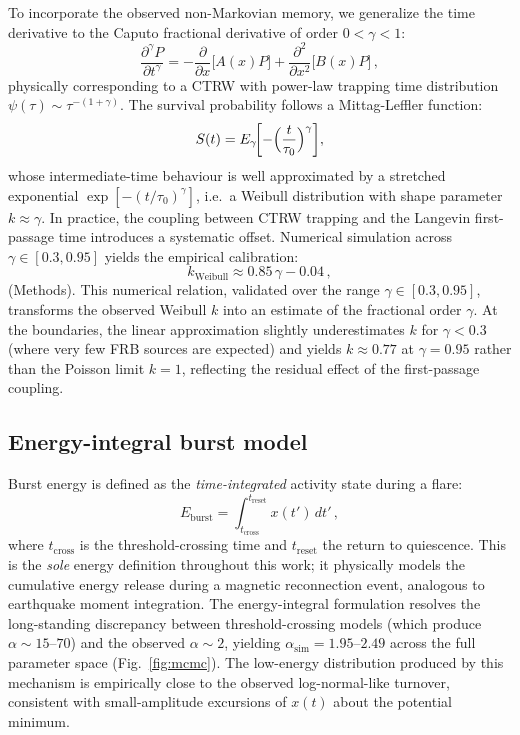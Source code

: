 \documentclass[twocolumn]{article}
\begin{document}
To incorporate the observed non-Markovian memory, we generalize the time derivative to the Caputo fractional derivative of order $0 < \gamma < 1$:
\begin{equation}
\frac{\partial^\gamma P}{\partial t^\gamma} = -\frac{\partial}{\partial x}\bigl[A(x)P\bigr] + \frac{\partial^2}{\partial x^2}\bigl[B(x)P\bigr]\,,
\label{eq:FFPE}
\end{equation}
physically corresponding to a CTRW with power-law trapping time distribution $\psi(\tau) \sim \tau^{-(1+\gamma)}$\cite{metzler2000}. The survival probability follows a Mittag-Leffler function:
\begin{equation}
S(t) = E_\gamma\!\biggl[-\Bigl(\frac{t}{\tau_0}\Bigr)^\gamma\biggr],
\label{eq:mittag}
\end{equation}
whose intermediate-time behaviour is well approximated by a stretched exponential $\exp[-(t/\tau_0)^\gamma]$, i.e.\ a Weibull distribution with shape parameter $k \approx \gamma$. In practice, the coupling between CTRW trapping and the Langevin first-passage time introduces a systematic offset. Numerical simulation across $\gamma \in [0.3, 0.95]$ yields the empirical calibration:
\begin{equation}
k_{\mathrm{Weibull}} \approx 0.85\,\gamma - 0.04\,,
\label{eq:k_gamma}
\end{equation}
(Methods). This numerical relation, validated over the range $\gamma \in [0.3, 0.95]$, transforms the observed Weibull $k$ into an estimate of the fractional order $\gamma$. At the boundaries, the linear approximation slightly underestimates $k$ for $\gamma < 0.3$ (where very few FRB sources are expected) and yields $k \approx 0.77$ at $\gamma = 0.95$ rather than the Poisson limit $k = 1$, reflecting the residual effect of the first-passage coupling.


\subsection{Energy-integral burst model}
\label{sec:energy_integral}

Burst energy is defined as the \emph{time-integrated} activity state during a flare:
\begin{equation}
E_{\mathrm{burst}} = \int_{t_{\mathrm{cross}}}^{t_{\mathrm{reset}}} x(t')\,dt'\,,
\label{eq:energy}
\end{equation}
where $t_{\mathrm{cross}}$ is the threshold-crossing time and $t_{\mathrm{reset}}$ the return to quiescence. This is the \emph{sole} energy definition throughout this work; it physically models the cumulative energy release during a magnetic reconnection event, analogous to earthquake moment integration. The energy-integral formulation resolves the long-standing discrepancy between threshold-crossing models (which produce $\alpha \sim 15$--$70$) and the observed $\alpha \sim 2$, yielding $\alpha_{\mathrm{sim}} = 1.95$--$2.49$ across the full parameter space (Fig.~\ref{fig:mcmc}). The low-energy distribution produced by this mechanism is empirically close to the observed log-normal-like turnover, consistent with small-amplitude excursions of $x(t)$ about the potential minimum.
\end{document}
